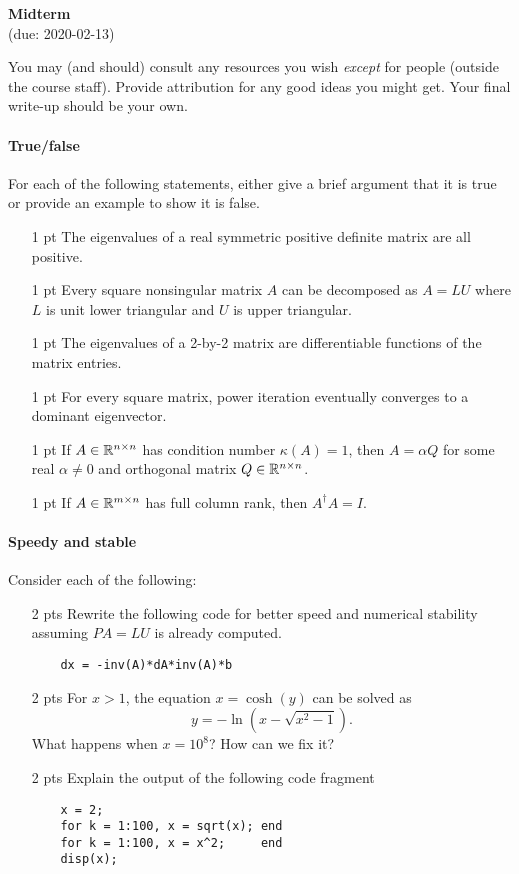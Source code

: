 \documentclass[12pt, leqno]{article} %
\begin{document}
\pagestyle{fancy}
\fancyfoot{}
\begin{center}
  {\large{\bf Midterm}} \\ (due: 2020-02-13)
\end{center}
\lstset{language=Julia,columns=flexible}

You may (and should) consult any resources you wish {\em except} for
people (outside the course staff).  Provide attribution for any good
ideas you might get.  Your final write-up should be your own.


\paragraph*{True/false}
For each of the following statements, either give a brief argument
that it is true or provide an example to show it is false.
\begin{itemize}
\item[1 pt]
  The eigenvalues of a real symmetric positive definite matrix are
  all positive.
\item[1 pt]
  Every square nonsingular matrix $A$ can be decomposed as $A =
  LU$ where $L$ is unit lower triangular and $U$ is upper triangular.
\item[1 pt]
  The eigenvalues of a 2-by-2 matrix are differentiable functions
  of the matrix entries.
\item[1 pt]
  For every square matrix, power iteration eventually converges to
  a dominant eigenvector.
\item[1 pt]
  If $A \in \mathbb{R}^{n \times n}$ has condition number $\kappa(A) = 1$,
  then $A = \alpha Q$ for some real $\alpha \neq 0$
  and orthogonal matrix $Q \in \mathbb{R}^{n \times n}$.
\item[1 pt]
  If $A \in \mathbb{R}^{m \times n}$ has full column rank, then $A^\dagger A = I$.
\end{itemize}
  
\paragraph*{Speedy and stable}
Consider each of the following:
\begin{itemize}
\item[2 pts]
  Rewrite the following code for better speed and numerical stability
  assuming $PA = LU$ is already computed.
  \begin{lstlisting}
    dx = -inv(A)*dA*inv(A)*b
  \end{lstlisting}
\item[2 pts]
  For $x > 1$, the equation $x = \cosh(y)$ can be solved as
  \[
    y = -\ln\left(x - \sqrt{x^2-1}\right).
  \]
  What happens when $x = 10^8$?  How can we fix it?
\item[2 pts]
  Explain the output of the following code fragment
  \begin{lstlisting}
    x = 2;
    for k = 1:100, x = sqrt(x); end
    for k = 1:100, x = x^2;     end
    disp(x);
  \end{lstlisting}
\end{itemize}
\end{document}

